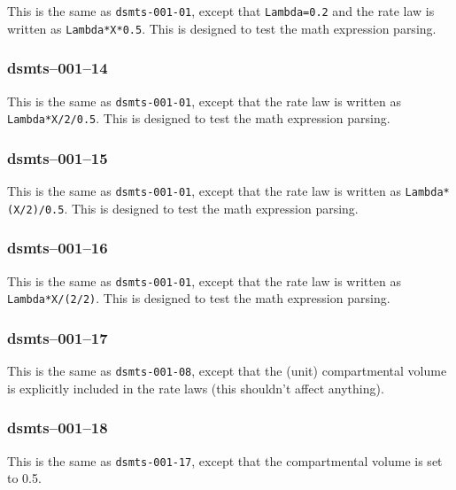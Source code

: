 This is the same as \verb$dsmts-001-01$, except that \verb$Lambda=0.2$
and the rate law is written as \verb$Lambda*X*0.5$. This is designed
to test the math expression parsing.


\subsubsection{dsmts--001--14}

This is the same as \verb$dsmts-001-01$, except that the rate law is
written as \verb$Lambda*X/2/0.5$. This is designed to test the math
expression parsing.


\subsubsection{dsmts--001--15}

This is the same as \verb$dsmts-001-01$, except that the rate law is
written as \verb$Lambda*(X/2)/0.5$. This is designed to test the math
expression parsing.


\subsubsection{dsmts--001--16}

This is the same as \verb$dsmts-001-01$, except that the rate law is
written as \verb$Lambda*X/(2/2)$. This is designed to test the math
expression parsing.


\subsubsection{dsmts--001--17}

This is the same as \verb$dsmts-001-08$, except that the (unit)
compartmental volume is explicitly included in the rate laws (this
shouldn't affect anything).


\subsubsection{dsmts--001--18}

This is the same as \verb$dsmts-001-17$, except that the
compartmental volume is set to 0.5.


